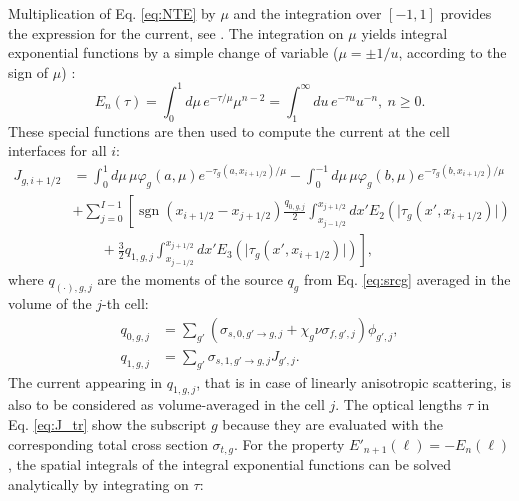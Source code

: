 \documentclass{ictt26}
\DeclareMathOperator{\sign}{sgn}
\begin{document}
Multiplication of Eq. \ref{eq:NTE} by $\mu$ and the integration over $[-1, 1]$ provides the expression for the current, see \cite{tomatis2011application}. The integration on $\mu$ yields integral exponential functions by a simple change of variable ($\mu = \pm 1/u$, according to the sign of $\mu$) \cite{AS1964handbook}:
\begin{equation*}
E_n(\tau) = \int_0^1{d\mu\, e^{-\tau / \mu} \mu^{n-2}} = \int_1^\infty{du\, e^{-\tau u}u^{-n}}, \: n \geq 0.
\end{equation*}
These special functions are then used to compute the current at the cell interfaces for all $i$:
\begin{equation}
\begin{split}
J_{g,i+1/2} &= \int_0^{ 1}{d\mu\, \mu \varphi_g(a, \mu) e^{-\tau_g(a, x_{i+1/2})/\mu}}
             - \int_0^{-1}{d\mu\, \mu \varphi_g(b, \mu) e^{-\tau_g(b, x_{i+1/2})/\mu}}\\
  & + \sum_{j=0}^{I-1} \left[  \sign(x_{i+1/2} - x_{j+1/2}) \frac{q_{0,g,j}}{2} \int_{x_{j-1/2}}^{x_{j+1/2}}{dx' E_{2}\left(\lvert \tau_g(x', x_{i+1/2}) \rvert \right) } \right.\\
  & \left. \qquad+ \frac{3}{2}q_{1,g,j} \int_{x_{j-1/2}}^{x_{j+1/2}}{dx' E_{3}\left(\lvert \tau_g(x', x_{i+1/2}) \rvert \right) }\right],
\end{split}
\label{eq:J_tr}
\end{equation}
where $q_{(\cdot),g,j}$ are the moments of the source $q_g$ from Eq. \ref{eq:srcg} averaged in the volume of the $j$-th cell:
\begin{subequations}
\label{eq:srclg}
\begin{align}
   q_{0,g,j} &= \sum_{g'}\left(\sigma_{s,0,g' \rightarrow g,j} +
                              \chi_g \nu\sigma_{f,g',j}
                        \right) \phi_{g',j},\label{eq:srclg0}\\
   q_{1,g,j} &= \sum_{g'}\sigma_{s,1,g' \rightarrow g,j}J_{g',j}.\label{eq:srclg1}
\end{align}
\end{subequations}
The current appearing in $q_{1,g,j}$, that is in case of linearly anisotropic scattering, is also to be considered as volume-averaged in the cell $j$. The optical lengths $\tau$ in Eq. \ref{eq:J_tr} show the subscript $g$ because they are evaluated with the corresponding total cross section $\sigma_{t,g}$. For the property $E'_{n+1}(\ell) = -E_n(\ell)$, the spatial integrals of the integral exponential functions can be solved analytically by integrating on $\tau$:
\end{document}
